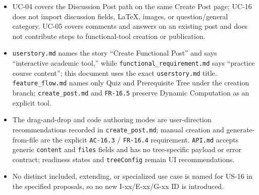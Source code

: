 \documentclass[12pt]{article}
\begin{document}
\begin{itemize}
\item UC-04 covers the Discussion Post path on the same Create Post page; UC-16 does not import discussion fields, LaTeX, images, or question/general category. UC-05 covers comments and answers on an existing post and does not contribute steps to functional-tool creation or publication.
\item \texttt{userstory.md} names the story “Create Functional Post” and says “interactive academic tool,” while \texttt{functional\_requirement.md} says “practice course content”; this document uses the exact \texttt{userstory.md} title. \texttt{feature\_flow.md} names only Quiz and Prerequisite Tree under the creation branch; \texttt{create\_post.md} and \texttt{FR-16.5} preserve Dynamic Computation as an explicit tool.
\item The drag-and-drop and code authoring modes are user-direction recommendations recorded in \texttt{create\_post.md}; manual creation and generate-from-file are the explicit \texttt{AC-16.3} / \texttt{FR-16.4} requirement. \texttt{API.md} accepts generic \texttt{content} and \texttt{files} fields and has no tree-specific payload or error contract; readiness states and \texttt{treeConfig} remain UI recommendations.
\item No distinct included, extending, or specialized use case is named for US-16 in the specified proposals, so no new I-xx/E-xx/G-xx ID is introduced.
\end{itemize}
\par\medskip

\par\medskip
\hypertarget{sec:ui-prototype-specimens}{}
\end{document}
